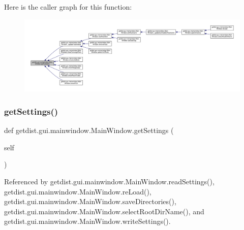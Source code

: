Here is the caller graph for this function\+:
\nopagebreak
\begin{figure}[H]
\begin{center}
\leavevmode
\includegraphics[width=350pt]{classgetdist_1_1gui_1_1mainwindow_1_1MainWindow_aff268010fdbaa0abe118cf5a3b50849f_icgraph}
\end{center}
\end{figure}
\mbox{\label{classgetdist_1_1gui_1_1mainwindow_1_1MainWindow_a3b46ccf380b69cea6f4f95ba9ec4ed4d}} 
\subsubsection{\texorpdfstring{get\+Settings()}{getSettings()}}
{\footnotesize\ttfamily def getdist.\+gui.\+mainwindow.\+Main\+Window.\+get\+Settings (\begin{DoxyParamCaption}\item[{}]{self }\end{DoxyParamCaption})}



Referenced by getdist.\+gui.\+mainwindow.\+Main\+Window.\+read\+Settings(), getdist.\+gui.\+mainwindow.\+Main\+Window.\+re\+Load(), getdist.\+gui.\+mainwindow.\+Main\+Window.\+save\+Directories(), getdist.\+gui.\+mainwindow.\+Main\+Window.\+select\+Root\+Dir\+Name(), and getdist.\+gui.\+mainwindow.\+Main\+Window.\+write\+Settings().

